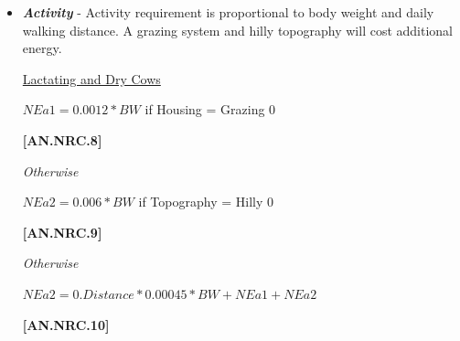 \begin{refsection}
\begin{itemize}
\begin{center}
    \(BCS9 = (BCS5 - 1) * 2 + 1\)
\end{center}
\vspace{0.5cm}
            {\raggedleft \textbf{[AN.NRC.6]}\par}

\vspace{0.25cm}
\begin{center}
    \(NEmaint = (BW - CW)^{0.75} * (0.086 * (0.8 + (BCS9 - 5) * 0.05) + 0.0007 * (20 - PrevTemp))\)
\end{center}
\vspace{0.5cm}
            {\raggedleft \textbf{[AN.NRC.7]}\par}

\vspace{0.25cm}

        \item \textbf{\textit {Activity}} - Activity requirement is proportional to body weight and daily walking distance. A grazing system and hilly topography will cost additional energy. 

        \vspace{0.2cm}
        \underline {Lactating and Dry Cows}
        \vspace{0.25cm}

    
\begin{center}
    \(NEa1 = 0.0012 * BW\) if Housing = Grazing 0
\end{center}
\vspace{0.5cm}
            {\raggedleft \textbf{[AN.NRC.8]}\par}
\textit{\small Otherwise}
\vspace{0.25cm}

\begin{center}
    \(NEa2 = 0.006 * BW\) if Topography = Hilly 0
\end{center}
\vspace{0.5cm}
            {\raggedleft \textbf{[AN.NRC.9]}\par}
\textit{\small Otherwise}
\vspace{0.25cm}

\begin{center}
    \(NEa2 = 0.Distance * 0.00045 * BW + NEa1 + NEa2\) 
\end{center}

\vspace{0.5cm}
            {\raggedleft \textbf{[AN.NRC.10]}\par}
            

\end{itemize}
\end{refsection}

